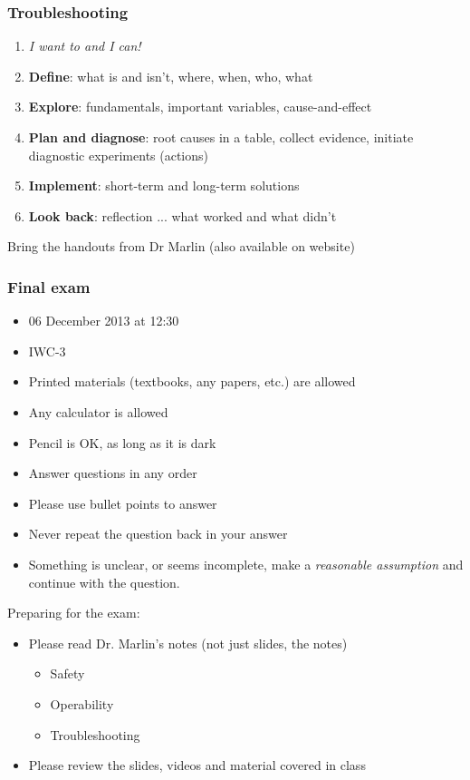 \begin{frame}\frametitle{Troubleshooting}
	\begin{enumerate}
		\item	\emph{I want to and I can!}
		\item	\textbf{Define}: what is and isn't, where, when, who, what
		\item	\textbf{Explore}: fundamentals, important variables, cause-and-effect
		\item	\textbf{Plan and diagnose}: root causes in a table, collect evidence, initiate diagnostic experiments (actions)
		\item	\textbf{Implement}: short-term and long-term solutions
		\item	\textbf{Look back}: reflection ... what worked and what didn't
	\end{enumerate}
	\vspace{12pt}
	Bring the handouts from Dr Marlin (also available on website)
\end{frame}

\begin{frame}\frametitle{Final exam}
	\begin{itemize}
		\item	06 December 2013 at 12:30
		\item	IWC-3
		\item	Printed materials (textbooks, any papers, etc.) are allowed
		\item	Any calculator is allowed
		\item	Pencil is OK, as long as it is dark
		\item	Answer questions in any order
		\item	Please use bullet points to answer
		\item	Never repeat the question back in your answer
		\item	Something is unclear, or seems incomplete, make a \emph{reasonable assumption} and continue with the question.
	\end{itemize}
	\vspace{12pt}
	Preparing for the exam:
	\begin{itemize}
		\item	Please read Dr. Marlin's notes (not just slides, the notes)
		\begin{itemize}
			\item	Safety
			\item	Operability
			\item	Troubleshooting
		\end{itemize}
		\item	Please review the slides, videos and material covered in class
	\end{itemize}
\end{frame}

